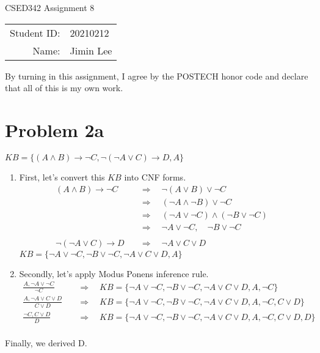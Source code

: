 \documentclass[12pt]{article}
\begin{document}
\begin{center}
{\Large CSED342 Assignment 8 \vspace{10pt}}

\begin{tabular}{rl}
Student ID: & 20210212 \\
Name: & Jimin Lee \\
\end{tabular}
\end{center}

\begin{center}
By turning in this assignment, I agree by the POSTECH honor code and declare that all of this is my own work.
\end{center}

\section*{Problem 2a}
$KB = \{(A \land B) \xrightarrow{} \neg C, \neg(\neg A \lor C) \xrightarrow{} D, A\}$ \\
\begin{enumerate}[label=(\roman*)]
    \item\text First, let's convert this $KB$ into CNF forms.
        \begin{align*}
            {(A \land B) \xrightarrow{} \neg C} \quad &\Rightarrow \quad {\neg(A \lor B) \lor \neg C} \quad \\&\Rightarrow \quad {(\neg A \land \neg B) \lor \neg C} \quad \\&\Rightarrow \quad {(\neg A \lor \neg C) \land (\neg B \lor \neg C)} \quad \\&\Rightarrow \quad {\neg A \lor \neg C, \quad \neg B \lor \neg C} \\ \\
            {\neg(\neg A \lor C) \xrightarrow{} D} \quad &\Rightarrow \quad {\neg A \lor C \lor D}
        \end{align*}
    $KB = \{{\neg A \lor \neg C, \neg B \lor \neg C}, {\neg A \lor C \lor D}, A\}$ \\
    \item\text Secondly, let's apply Modus Ponens inference rule. \\
        \begin{align*}
            \frac{A, \neg A \lor \neg C}{\neg C} \quad &\Rightarrow \quad KB = \{{\neg A \lor \neg C, \neg B \lor \neg C}, {\neg A \lor C \lor D}, A,\neg C\} \\
            \frac{A, \neg A \lor C \lor D}{C \lor D} \quad &\Rightarrow \quad KB = \{{\neg A \lor \neg C, \neg B \lor \neg C}, {\neg A \lor C \lor D}, A,\neg C, C \lor D\} \\
            \frac{\neg C, C \lor D}{D} \quad &\Rightarrow \quad KB = \{{\neg A \lor \neg C, \neg B \lor \neg C}, {\neg A \lor C \lor D}, A,\neg C, C \lor D, D\} \\
        \end{align*}
\end{enumerate}
\text Finally, we derived D. \\
\end{document}
